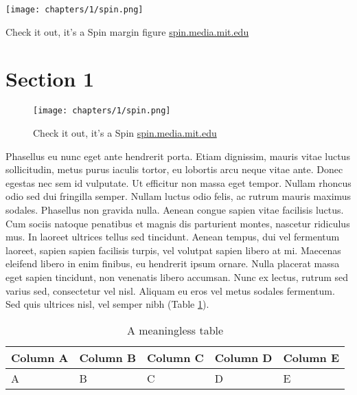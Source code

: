 \begin{marginfigure}[{-10cm}]
 	\texttt{[image: chapters/1/spin.png]}               
 	 \caption{Check it out, it's a Spin margin figure \url{spin.media.mit.edu}}
  	\label{fig:spin_margin}
\end{marginfigure}

\section{Section 1}

\begin{figure}[htb]
 	\texttt{[image: chapters/1/spin.png]}               
 	 \caption{Check it out, it's a Spin \url{spin.media.mit.edu}}
  	\label{fig:spin}
\end{figure}

Phasellus eu nunc eget ante hendrerit porta. Etiam dignissim, mauris vitae luctus sollicitudin, metus purus iaculis tortor, eu lobortis arcu neque vitae ante. Donec egestas nec sem id vulputate. Ut efficitur non massa eget tempor. Nullam rhoncus odio sed dui fringilla semper. Nullam luctus odio felis, ac rutrum mauris maximus sodales. Phasellus non gravida nulla. Aenean congue sapien vitae facilisis luctus. Cum sociis natoque penatibus et magnis dis parturient montes, nascetur ridiculus mus. In laoreet ultrices tellus sed tincidunt. Aenean tempus, dui vel fermentum laoreet, sapien sapien facilisis turpis, vel volutpat sapien libero at mi. Maecenas eleifend libero in enim finibus, eu hendrerit ipsum ornare. Nulla placerat massa eget sapien tincidunt, non venenatis libero accumsan. Nunc ex lectus, rutrum sed varius sed, consectetur vel nisl. Aliquam eu eros vel metus sodales fermentum. Sed quis ultrices nisl, vel semper nibh (Table \ref{tab:sample_table}).

\begin{table}
  \centering
  \begin{tabular}{l l l l l}
    Column A & Column B & Column C & Column D & Column E \\
    \toprule
    A & B & C & D & E
  \end{tabular}
  \caption{A meaningless table}
  \label{tab:sample_table}
\end{table}
